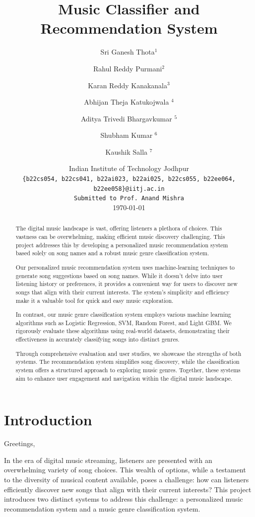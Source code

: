 \documentclass[a4paper, 24pt]{article}
\title{\fontsize{16}{18}\selectfont Music Classifier and Recommendation System} %
\author{
Sri Ganesh Thota$^1$ \and
Rahul Reddy Purmani$^2$ \and
Karan Reddy Kanakanala$^3$ \and
Abhijan Theja Katukojwala $^4$ \and
Aditya Trivedi Bhargavkumar $^5$ \and
Shubham Kumar $^6$ \and
Kaushik Salla $^7$
}
\date{
Indian Institute of Technology Jodhpur \\ 
\texttt{\{b22cs054, b22cs041, b22ai023, b22ai025, b22cs055, b22ee064, b22ee058\}@iitj.ac.in} \\
\texttt{Submitted to Prof. Anand Mishra} \\ 
\today
}
\newcommand{\abstractfont}{\fontsize{12}{14}\selectfont} %
\begin{document}
\maketitle

\begin{abstract}
\abstractfont
The digital music landscape is vast, offering listeners a plethora of choices. This vastness can be overwhelming, making efficient music discovery challenging. This project addresses this by developing a personalized music recommendation system based solely on song names and a robust music genre classification system.

Our personalized music recommendation system uses machine-learning techniques to generate song suggestions based on song names. While it doesn't delve into user listening history or preferences, it provides a convenient way for users to discover new songs that align with their current interests. The system's simplicity and efficiency make it a valuable tool for quick and easy music exploration.

In contrast, our music genre classification system employs various machine learning algorithms such as Logistic Regression, SVM, Random Forest, and Light GBM. We rigorously evaluate these algorithms using real-world datasets, demonstrating their effectiveness in accurately classifying songs into distinct genres.

Through comprehensive evaluation and user studies, we showcase the strengths of both systems. The recommendation system simplifies song discovery, while the classification system offers a structured approach to exploring music genres. Together, these systems aim to enhance user engagement and navigation within the digital music landscape.
\end{abstract}

\newpage

\tableofcontents

\newpage

\section{Introduction}
\label{sec:intro}

Greetings,

In the era of digital music streaming, listeners are presented with an overwhelming variety of song choices. This wealth of options, while a testament to the diversity of musical content available, poses a challenge: how can listeners efficiently discover new songs that align with their current interests? This project introduces two distinct systems to address this challenge: a personalized music recommendation system and a music genre classification system.
\end{document}
